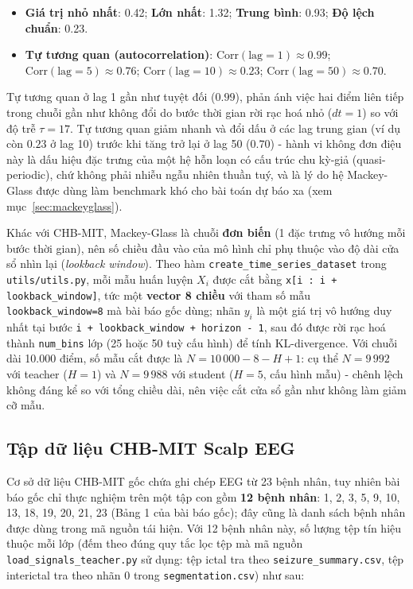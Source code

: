 \begin{itemize}
	\item \textbf{Giá trị nhỏ nhất}: 0.42; \textbf{Lớn nhất}: 1.32; \textbf{Trung bình}: 0.93;
	\textbf{Độ lệch chuẩn}: 0.23.
	\item \textbf{Tự tương quan (autocorrelation)}: $\text{Corr}(\text{lag}=1) \approx 0.99$;
	$\text{Corr}(\text{lag}=5) \approx 0.76$; $\text{Corr}(\text{lag}=10) \approx 0.23$;
	$\text{Corr}(\text{lag}=50) \approx 0.70$.
\end{itemize}

Tự tương quan ở lag 1 gần như tuyệt đối ($0.99$), phản ánh việc hai điểm liên tiếp trong chuỗi
gần như không đổi do bước thời gian rời rạc hoá nhỏ ($dt=1$) so với độ trễ $\tau=17$. Tự tương
quan giảm nhanh và đổi dấu ở các lag trung gian (ví dụ còn $0.23$ ở lag 10) trước khi tăng trở
lại ở lag 50 ($0.70$) - hành vi không đơn điệu này là dấu hiệu đặc trưng của một hệ hỗn loạn
có cấu trúc chu kỳ-giả (quasi-periodic), chứ không phải nhiễu ngẫu nhiên thuần tuý, và là lý do
hệ Mackey-Glass được dùng làm benchmark khó cho bài toán dự báo xa (xem mục~\ref{sec:mackeyglass}).

Khác với CHB-MIT, Mackey-Glass là chuỗi \textbf{đơn biến} (1 đặc trưng vô hướng mỗi bước thời
gian), nên số chiều đầu vào của mô hình chỉ phụ thuộc vào độ dài cửa sổ nhìn lại
(\textit{lookback window}). Theo hàm \texttt{create\_time\_series\_dataset} trong
\texttt{utils/utils.py}, mỗi mẫu huấn luyện $X_i$ được cắt bằng
\texttt{x[i : i + lookback\_window]}, tức một \textbf{vector 8 chiều} với tham số mẫu
\texttt{lookback\_window=8} mà bài báo gốc dùng; nhãn $y_i$ là một giá trị vô hướng duy nhất tại
bước \texttt{i + lookback\_window + horizon - 1}, sau đó được rời rạc hoá thành \texttt{num\_bins}
lớp (25 hoặc 50 tuỳ cấu hình) để tính KL-divergence. Với chuỗi dài
10.000 điểm, số mẫu cắt được là $N = 10\,000 - 8 - H + 1$: cụ thể $N=9\,992$ với teacher
($H=1$) và $N=9\,988$ với student ($H=5$, cấu hình mẫu) - chênh lệch không đáng kể so với tổng
chiều dài, nên việc cắt cửa sổ gần như không làm giảm cỡ mẫu.

\subsection{Tập dữ liệu CHB-MIT Scalp EEG}

Cơ sở dữ liệu CHB-MIT gốc chứa ghi chép EEG từ 23 bệnh nhân, tuy nhiên bài báo gốc chỉ thực
nghiệm trên một tập con gồm \textbf{12 bệnh nhân}: 1, 2, 3, 5, 9, 10, 13, 18, 19, 20, 21, 23
(Bảng 1 của bài báo gốc); đây cũng là danh sách bệnh nhân được dùng trong mã nguồn tái hiện.
Với 12 bệnh nhân này, số lượng tệp tín hiệu thuộc mỗi lớp (đếm theo đúng quy tắc lọc tệp mà mã
nguồn \texttt{load\_signals\_teacher.py} sử dụng: tệp ictal tra theo \texttt{seizure\_summary.csv},
tệp interictal tra theo nhãn 0 trong \texttt{segmentation.csv}) như sau:

